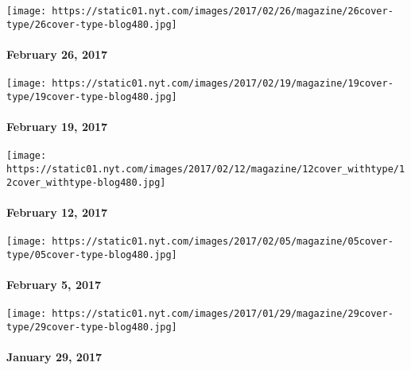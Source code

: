 \href{https://www.nytimes.com/issue/magazine/2017/02/24/magazine-index-20170226}{}

\texttt{[image: https://static01.nyt.com/images/2017/02/26/magazine/26cover-type/26cover-type-blog480.jpg]}

\hypertarget{february-26-2017}{%
\paragraph{February 26, 2017}\label{february-26-2017}}

\href{http://www.nytimes.com/issue/magazine/2017/02/17/the-21917-issue-20170219}{}

\texttt{[image: https://static01.nyt.com/images/2017/02/19/magazine/19cover-type/19cover-type-blog480.jpg]}

\hypertarget{february-19-2017}{%
\paragraph{February 19, 2017}\label{february-19-2017}}

\href{https://www.nytimes.com/issue/magazine/2017/02/10/magazine-index-20170212}{}

\texttt{[image: https://static01.nyt.com/images/2017/02/12/magazine/12cover\_withtype/12cover\_withtype-blog480.jpg]}

\hypertarget{february-12-2017}{%
\paragraph{February 12, 2017}\label{february-12-2017}}

\href{http://www.nytimes.com/issue/magazine/2017/02/05/magazine-index}{}

\texttt{[image: https://static01.nyt.com/images/2017/02/05/magazine/05cover-type/05cover-type-blog480.jpg]}

\hypertarget{february-5-2017}{%
\paragraph{February 5, 2017}\label{february-5-2017}}

\href{http://www.nytimes.com/issue/magazine/2017/01/27/12917-issue-20170129}{}

\texttt{[image: https://static01.nyt.com/images/2017/01/29/magazine/29cover-type/29cover-type-blog480.jpg]}

\hypertarget{january-29-2017}{%
\paragraph{January 29, 2017}\label{january-29-2017}}

